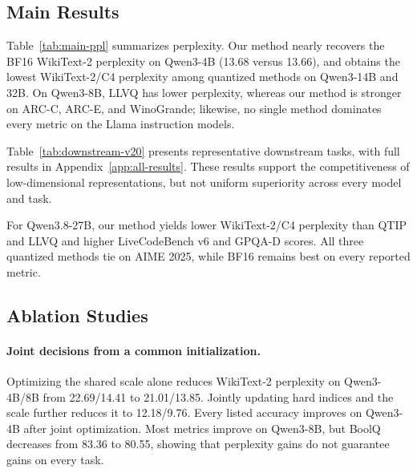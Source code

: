 \subsection{Main Results}

Table~\ref{tab:main-ppl} summarizes perplexity. Our method nearly recovers the BF16 WikiText-2 perplexity on Qwen3-4B (13.68 versus 13.66), and obtains the lowest WikiText-2/C4 perplexity among quantized methods on Qwen3-14B and 32B.
On Qwen3-8B, LLVQ has lower perplexity, whereas our method is stronger on ARC-C, ARC-E, and WinoGrande; likewise, no single method dominates every metric on the Llama instruction models.


Table~\ref{tab:downstream-v20} presents representative downstream tasks, with full results in Appendix~\ref{app:all-results}. These results support the competitiveness of low-dimensional representations, but not uniform superiority across every model and task.


For Qwen3.8-27B, our method yields lower WikiText-2/C4 perplexity than QTIP and LLVQ and higher LiveCodeBench v6 and GPQA-D scores. All three quantized methods tie on AIME 2025, while BF16 remains best on every reported metric.


\subsection{Ablation Studies}

\paragraph{Joint decisions from a common initialization.} Optimizing the shared scale alone reduces WikiText-2 perplexity on Qwen3-4B/8B from 22.69/14.41 to 21.01/13.85. Jointly updating hard indices and the scale further reduces it to 12.18/9.76.
Every listed accuracy improves on Qwen3-4B after joint optimization. Most metrics improve on Qwen3-8B, but BoolQ decreases from 83.36 to 80.55, showing that perplexity gains do not guarantee gains on every task.


